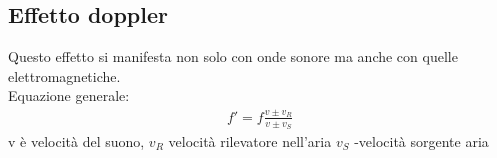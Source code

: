 \documentclass[a4paper,11pt]{article}
\begin{document}
 \subsection{Effetto doppler}
Questo effetto si manifesta non solo con onde sonore ma anche con quelle elettromagnetiche. 
\\ 
Equazione generale:
\begin{align*}
    f' = f \frac{v \pm v_R}{v \pm v_S}
\end{align*} 
v è velocità del suono, \(v_R\) velocità rilevatore nell'aria \(v_S\) -velocità sorgente aria
\end{document}
